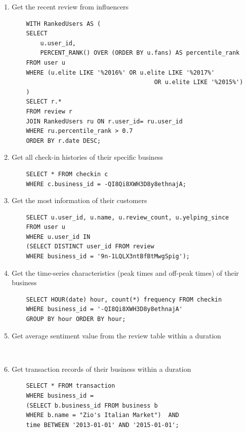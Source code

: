 \documentclass[runningheads]{llncs}
\begin{document}
\begin{enumerate}
    \item  Get the recent review from influencers 
    \begin{verbatim}
    WITH RankedUsers AS (
    SELECT 
        u.user_id,
        PERCENT_RANK() OVER (ORDER BY u.fans) AS percentile_rank
    FROM user u
    WHERE (u.elite LIKE '%2016%' OR u.elite LIKE '%2017%' 
                                        OR u.elite LIKE '%2015%')
    )
    SELECT r.*
    FROM review r
    JOIN RankedUsers ru ON r.user_id= ru.user_id
    WHERE ru.percentile_rank > 0.7
    ORDER BY r.date DESC;
    \end{verbatim}

    \item Get all check-in histories of their specific business
    \begin{verbatim}
    SELECT * FROM checkin c 
    WHERE c.business_id = -QI8Qi8XWH3D8y8ethnajA;
    \end{verbatim}
    
    \item Get the most information of their customers 
    \begin{verbatim}
    SELECT u.user_id, u.name, u.review_count, u.yelping_since 
    FROM user u 
    WHERE u.user_id IN 
    (SELECT DISTINCT user_id FROM review 
    WHERE business_id = '9n-1LQLX3ntBfBtMwgSpig');
    \end{verbatim}
    
    \item Get the time-series characteristics (peak times and off-peak times) of their business
    \begin{verbatim}
    SELECT HOUR(date) hour, count(*) frequency FROM checkin 
    WHERE business_id = '-QI8Qi8XWH3D8y8ethnajA' 
    GROUP BY hour ORDER BY hour;
    \end{verbatim}

    \item Get average sentiment value from the review table within a duration
    \begin{verbatim}
    
    \end{verbatim}

    \item Get transaction records of their business within a duration
    \begin{verbatim}
    SELECT * FROM transaction 
    WHERE business_id =  
    (SELECT b.business_id FROM business b 
    WHERE b.name = "Zio's Italian Market")  AND
    time BETWEEN '2013-01-01' AND '2015-01-01';
    \end{verbatim}
    

\end{enumerate}
\end{document}
